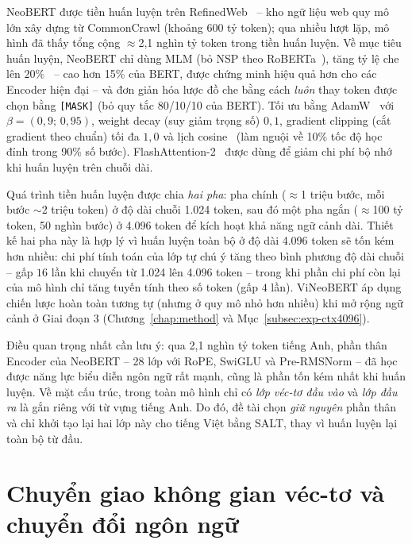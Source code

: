NeoBERT được tiền huấn luyện trên RefinedWeb~\cite{penedo2023refinedweb} -- kho ngữ liệu web
quy mô lớn xây dựng từ CommonCrawl (khoảng 600 tỷ token); qua nhiều lượt lặp, mô hình đã thấy tổng cộng $\approx$2,1 nghìn tỷ token trong tiền huấn luyện. Về mục tiêu
huấn luyện, NeoBERT chỉ dùng MLM (bỏ NSP theo RoBERTa~\cite{liu2019roberta}), tăng tỷ lệ
che lên $20\%$~\cite{wettig2023mask} -- cao hơn 15\% của BERT, được chứng minh hiệu quả hơn
cho các Encoder hiện đại -- và đơn giản hóa lược đồ che bằng cách \textit{luôn} thay token
được chọn bằng \texttt{[MASK]} (bỏ quy tắc 80/10/10 của BERT). Tối ưu bằng
AdamW~\cite{loshchilov2019adamw} với
$\beta = (0{,}9;\, 0{,}95)$, weight decay (suy giảm trọng số) $0{,}1$, gradient clipping (cắt gradient theo chuẩn) tối đa $1{,}0$ và
lịch cosine~\cite{loshchilov2017sgdr} (làm nguội về 10\% tốc độ học đỉnh trong 90\% số bước).
FlashAttention-2~\cite{dao2023flashattention2} được dùng để giảm chi phí bộ nhớ khi huấn
luyện trên chuỗi dài.

Quá trình tiền huấn luyện được chia \textit{hai pha}: pha chính ($\approx$1 triệu bước, mỗi
bước $\sim$2 triệu token) ở độ dài chuỗi 1.024 token, sau đó một pha ngắn ($\approx$100 tỷ
token, 50 nghìn bước) ở 4.096 token để
kích hoạt khả năng ngữ cảnh dài. Thiết kế hai pha này là hợp lý vì huấn luyện toàn bộ ở độ
dài 4.096 token sẽ tốn kém hơn nhiều: chi phí tính toán của lớp tự chú ý tăng theo bình
phương độ dài chuỗi -- gấp $16$ lần khi chuyển từ 1.024 lên 4.096 token -- trong khi phần
chi phí còn lại của mô hình chỉ tăng tuyến tính theo số token (gấp $4$ lần). ViNeoBERT áp dụng chiến lược hoàn toàn tương tự (nhưng ở quy mô nhỏ hơn nhiều) khi
mở rộng ngữ cảnh ở Giai đoạn 3
(Chương~\ref{chap:method} và Mục~\ref{subsec:exp-ctx4096}).

Điều quan trọng nhất cần lưu ý: qua 2,1 nghìn tỷ token tiếng Anh, phần thân Encoder của
NeoBERT -- 28 lớp với RoPE, SwiGLU và Pre-RMSNorm -- đã học được năng lực biểu diễn ngôn ngữ
rất mạnh, cũng là phần tốn kém nhất khi huấn luyện. Về mặt cấu trúc, trong toàn mô hình chỉ
có \textit{lớp véc-tơ đầu vào} và \textit{lớp đầu ra} là gắn riêng với từ vựng tiếng Anh. Do
đó, đề tài chọn \textit{giữ nguyên} phần thân và chỉ khởi tạo lại hai lớp này cho tiếng Việt
bằng SALT, thay vì huấn luyện lại toàn bộ từ đầu.

\section{Chuyển giao không gian véc-tơ và chuyển đổi ngôn ngữ}
\label{sec:transfer}

